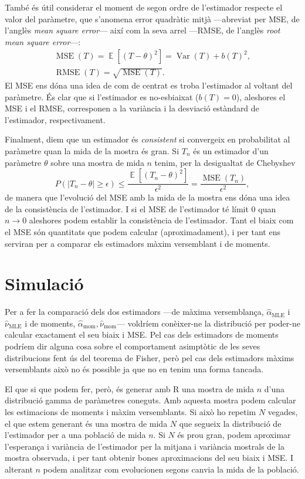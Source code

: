 \documentclass[12pt, catalan]{article}
\numberwithin{table}{section}
\numberwithin{figure}{section}
\numberwithin{equation}{section}
\DeclareMathOperator{\MSE}{MSE}
\DeclareMathOperator{\RMSE}{RMSE}
\DeclareMathOperator{\E}{\mathbb{E}}
\DeclareMathOperator{\Var}{Var}
\newcommand{\abs}[1]{\left|#1\right|}
\begin{document}
També és útil considerar el moment de segon ordre de l'estimador respecte el valor del paràmetre, que s'anomena error quadràtic mitjà ---abreviat per MSE, de l'anglès \emph{mean square error}--- així com la seva arrel ---RMSE, de l'anglès \emph{root mean square error}---:
\begin{gather*}
    \MSE{(T)} = \E{[(T-\theta)^2]} = \Var{(T)} + b(T)^2,\\
    \RMSE{(T)} =\sqrt{\MSE{(T)}}.
\end{gather*}
El MSE ens dóna una idea de com de centrat es troba l'estimador al voltant del paràmetre. És clar que si l'estimador es no-esbiaixat ($b(T)=0$), aleshores el MSE i el RMSE, corresponen a la variància i la desviació estàndard de l'estimador, respectivament.

Finalment, diem que un estimador és \emph{consistent} si convergeix en probabilitat al paràmetre quan la mida de la mostra és gran. Si \( T_n \) és un estimador d'un paràmetre \( \theta \) sobre una mostra de mida \( n \) tenim, per la desigualtat de Chebyshev
\begin{equation*}
  P\left( \abs{T_n - \theta} \geq \epsilon \right) \leq \frac{\E{[(T_n - \theta)^2]}}{\epsilon^2}  = \frac{\MSE{(T_n)}}{\epsilon^2},
\end{equation*}
de manera que l'evolució del MSE amb la mida de la mostra ens dóna una idea de la consistència de l'estimador. I si el MSE de l'estimador té límit 0 quan \(  n \to 0 \) aleshores podem establir la consistència de l'estimador. Tant el biaix com el MSE són quantitats que podem calcular (aproximadament), i per tant ens serviran per a comparar els estimadors màxim versemblant i de moments.

\section{Simulació}
Per a fer la comparació dels dos estimadors ---de màxima versemblança, $\hat{\alpha}_\text{MLE}$ i $\hat{\nu}_\text{MLE}$ i de moments, $\hat{\alpha}_\text{mom}, \hat{\nu}_\text{mom}$--- voldríem conèixer-ne la distribució per poder-ne calcular exactament el seu biaix i MSE. Pel cas dels estimadors de moments podríem dir alguna cosa sobre el comportament asimptòtic de les seves distribucions fent ús del teorema de Fisher, però pel cas dels estimadors màxims versemblants això no és possible ja que no en tenim una forma tancada.

El que si que podem fer, però, és generar amb R una mostra de mida $n$ d'una distribució gamma de paràmetres coneguts. Amb aquesta mostra podem calcular les estimacions de moments i màxim versemblants. Si això ho repetim $N$ vegades, el que estem generant és una mostra de mida $N$ que segueix la distribució de l'estimador per a una població de mida $n$. Si $N$ és prou gran, podem aproximar l'esperança i variància de l'estimador per la mitjana i variància mostrals de la mostra observada, i per tant obtenir bones aproximacions del seu biaix i MSE. I alterant $n$ podem analitzar com evolucionen segons canvia la mida de la població. 
\end{document}

